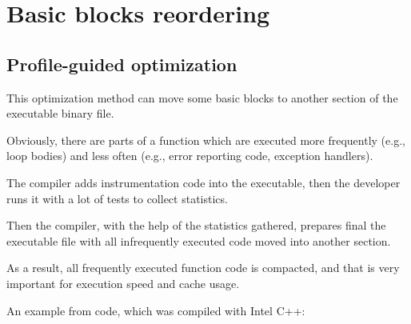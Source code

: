 \section{Basic blocks reordering}


\subsection{Profile-guided optimization}
\label{PGO}

\myindex{\oracle}

This optimization method can move some \gls{basic block}s to another section of the executable binary file.

Obviously, there are parts of a function which are executed more frequently (e.g., loop bodies)
and less often (e.g., error reporting code, exception handlers).

The compiler adds instrumentation code into the executable, then the developer runs it with
a lot of tests to collect statistics.

Then the compiler, with the help of the statistics gathered,
prepares final the executable file with all infrequently executed code moved into another section.

As a result, all frequently executed function code is compacted, and that is very important
for execution speed and cache usage.

An example from \oracle code, which was compiled with Intel C++:

